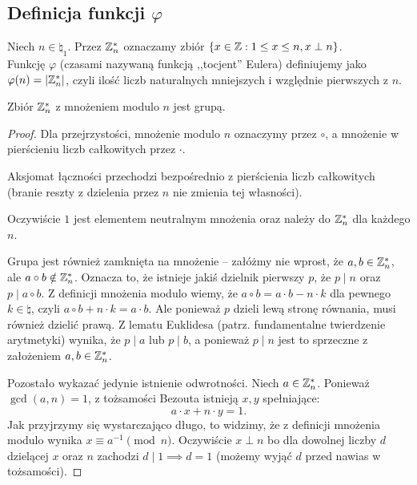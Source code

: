 \subsection{Definicja funkcji \texorpdfstring{\(\varphi\)}{phi}}
\begin{definition}
	Niech \(n \in \natural_1\). Przez \(\mathbb{Z}_n^*\) oznaczamy zbiór \(\set{x \in \integer: 1 \leq x \leq n, x \perp n}\). \\
	Funkcję \(\varphi\) (czasami nazywaną funkcją ,,tocjent'' Eulera) definiujemy jako
	\(\varphi(n) = \card{\integer_n^*}\), czyli ilość liczb naturalnych mniejszych i względnie pierwszych z \(n\).
\end{definition}

\begin{theorem}
	\label{nt:phigrupa}
	Zbiór \(\mathbb{Z}_n^*\) z mnożeniem modulo \(n\) jest grupą.
\end{theorem}
\begin{proof}
	Dla przejrzystości, mnożenie modulo \(n\) oznaczymy przez \(\circ\), a mnożenie w pierścieniu liczb całkowitych przez \(\cdot\).

	Aksjomat łączności przechodzi bezpośrednio z pierścienia liczb całkowitych (branie reszty z dzielenia przez \(n\) nie zmienia tej własności).

	Oczywiście \(1\) jest elementem neutralnym mnożenia oraz należy do \(\mathbb{Z}_n^*\) dla każdego \(n\).

	Grupa jest również zamknięta na mnożenie -- załóżmy nie wprost, że \(a,b \in \mathbb{Z}_n^*\), ale \(a \circ b \notin \mathbb{Z}_n^*\).
	Oznacza to, że istnieje jakiś dzielnik pierwszy \(p\), że \(p \mid n\) oraz \(p \mid a \circ b\).
	Z definicji mnożenia modulo wiemy, że \(a \circ b = a \cdot b - n \cdot k\) dla pewnego \(k \in \natural\), czyli
	\(a \circ b + n \cdot k = a \cdot b\). Ale ponieważ \(p\) dzieli lewą stronę równania, musi również
	dzielić prawą. Z lematu Euklidesa (patrz. fundamentalne twierdzenie arytmetyki) wynika, że
	\(p \mid a\) lub \(p \mid b\), a ponieważ \(p \mid n\) jest to sprzeczne z założeniem \(a, b \in \mathbb{Z}_n^*\).

	Pozostało wykazać jedynie istnienie odwrotności. Niech \(a \in \mathbb{Z}_n^*\). Ponieważ
	\(\gcd(a, n) = 1\), z tożsamości Bezouta istnieją \(x, y\) spełniające:
	\[a \cdot x + n \cdot y = 1.\] Jak przyjrzymy się wystarczająco długo,
	to widzimy, że z definicji mnożenia modulo wynika \(x \equiv a^{-1} \pmod n\).
	Oczywiście \(x \perp n\) bo dla dowolnej liczby \(d\) dzielącej \(x\) oraz \(n\)
	zachodzi \(d \mid 1 \implies d = 1\) (możemy wyjąć \(d\) przed nawias w tożsamości).
\end{proof}

